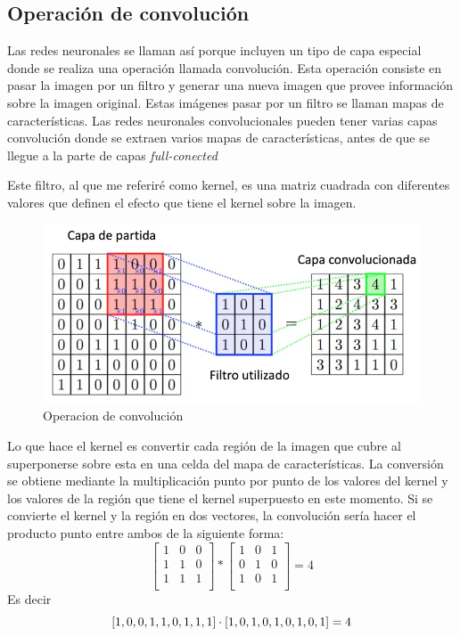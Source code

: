 \documentclass[14pt,a4paper]{report}
\begin{document}
\subsection*{Operación de convolución}

Las redes neuronales se llaman así porque incluyen un tipo de capa especial donde se realiza una operación llamada convolución. Esta operación consiste en pasar la imagen por un filtro y generar una nueva imagen que provee información sobre la imagen original. Estas imágenes pasar por un filtro se llaman mapas de características. Las redes neuronales convolucionales pueden tener varias capas convolución donde se extraen varios mapas de características, antes de que se llegue a la parte de capas \textit{full-conected}

Este filtro, al que me referiré como kernel, es una matriz cuadrada con diferentes valores que definen el efecto que tiene el kernel sobre la imagen.

\begin{figure}[h]
  \centering
\includegraphics[scale=0.7]{../convolucion.png} 
  \caption{Operacion de convolución}
  \label{fig:neural-network}
\end{figure}

Lo que hace el kernel es convertir cada región de la imagen que cubre al superponerse sobre esta en una celda del mapa de características. La conversión se obtiene mediante la multiplicación punto por punto de los valores del kernel y los valores de la región que tiene el kernel superpuesto en este momento. Si se convierte el kernel y la región en dos vectores, la convolución sería hacer el producto punto entre ambos de la siguiente forma:
$$
\begin{bmatrix}
1 & 0 & 0 \\
1 & 1 & 0 \\
1 & 1 & 1 \\
\end{bmatrix}
*
\begin{bmatrix}
1 & 0 & 1 \\
0 & 1 & 0 \\
1 & 0 & 1 \\
\end{bmatrix}
=
4
$$
Es decir
$$
[1, 0, 0, 1, 1, 0, 1, 1, 1]\cdot[1, 0, 1, 0, 1, 0, 1, 0, 1]=4\\
$$
\end{document}
